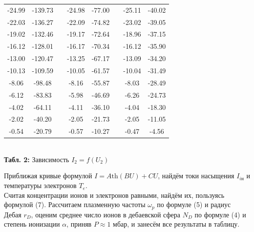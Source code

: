 \documentclass[12pt,a4paper]{scrartcl}
\begin{document}
\begin{table}[h]
\begin{tabular}{|c|c|c|c|c|c|c|c|}
-24.99         & -139.73        &  & -24.98        & -77.00         &  & -25.11         & -40.02          \\ \cline{1-2} \cline{4-5} \cline{7-8} 
-22.03         & -136.27        &  & -22.09        & -74.82         &  & -23.02         & -39.05          \\ \cline{1-2} \cline{4-5} \cline{7-8} 
-19.02         & -132.46        &  & -19.17        & -72.64         &  & -18.96         & -37.15          \\ \cline{1-2} \cline{4-5} \cline{7-8} 
-16.12         & -128.01        &  & -16.17        & -70.34         &  & -16.12         & -35.90          \\ \cline{1-2} \cline{4-5} \cline{7-8} 
-13.00         & -120.47        &  & -13.25        & -67.17         &  & -13.09         & -34.20          \\ \cline{1-2} \cline{4-5} \cline{7-8} 
-10.13         & -109.59        &  & -10.05        & -61.57         &  & -10.04         & -31.49          \\ \cline{1-2} \cline{4-5} \cline{7-8} 
-8.06          & -98.48         &  & -8.16         & -55.87         &  & -8.03          & -28.49          \\ \cline{1-2} \cline{4-5} \cline{7-8} 
-6.12          & -83.83         &  & -5.98         & -46.69         &  & -6.26          & -24.73          \\ \cline{1-2} \cline{4-5} \cline{7-8} 
-4.02          & -64.11         &  & -4.11         & -36.10         &  & -4.04          & -18.30          \\ \cline{1-2} \cline{4-5} \cline{7-8} 
-2.02          & -40.20         &  & -2.05         & -21.73         &  & -2.05          & -11.05          \\ \cline{1-2} \cline{4-5} \cline{7-8} 
-0.54          & -20.79         &  & -0.57         & -10.27         &  & -0.47          & -4.56           \\ \cline{1-2} \cline{4-5} \cline{7-8} 
\end{tabular}
\\\textbf{Табл. 2:} Зависимость $I_2 = f(U_2)$
\end{table}	

Приближая кривые формулой $I = A \text{th}(BU) + CU$, найдём токи насыщения $I_{i\text{н}}$ и температуры электронов $T_e$.\\
Считая концентрации ионов и электронов равными, найдём их, пользуясь формулой (7). Рассчитаем плазменную частоты $\omega_p$ по формуле (5) и радиус Дебая $r_D$, оценим среднее число ионов в дебаевской сфера $N_D$ по формуле (4) и  степень ионизации $\alpha$, приняв $P\approx 1$ мбар, и занесём все результаты в таблицу.
\end{document}
